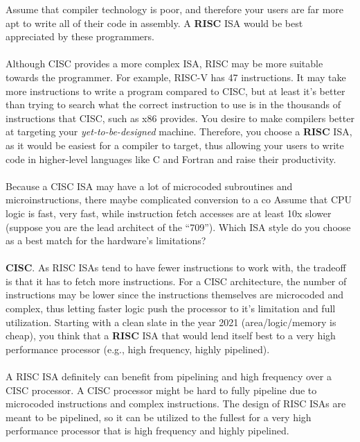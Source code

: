\documentclass[11pt]{article}
\begin{document}
\newpage

\begin{Parts}
	\Part
	Assume that compiler technology is poor, and therefore your users are far more apt to write all of their code in assembly. A \textbf{RISC} ISA would be best appreciated by these programmers. \\ \\
	Although CISC provides a more complex ISA, RISC may be more suitable towards the programmer. For example, RISC-V has 47 instructions. It may take more instructions to write a program compared to CISC, but at least it's better than trying to search what the correct instruction to use is in the thousands of instructions that CISC, such as x86 provides.
	\Part You desire to make compilers better at targeting your \textit{yet-to-be-designed} machine. Therefore, you choose a \textbf{RISC} ISA, as it would be easiest for a compiler to target, thus allowing your users to write code in higher-level languages like C and Fortran and raise their productivity. \\ \\
	Because a CISC ISA may have a lot of microcoded subroutines and microinstructions, there maybe complicated conversion to a co
	\Part Assume that CPU logic is fast, very fast, while instruction fetch accesses are at least 10x slower (suppose you are the lead architect of the “709”). Which ISA style do you choose as a best match for the hardware’s limitations? \\ \\
	\textbf{CISC}. As RISC ISAs tend to have fewer instructions to work with, the tradeoff is that it has to fetch more instructions. For a CISC architecture, the number of instructions may be lower since the instructions themselves are microcoded and complex, thus letting faster logic push the processor to it's limitation and full utilization.
	\Part Starting with a clean slate in the year 2021 (area/logic/memory is cheap), you think that a \textbf{RISC} ISA that would lend itself best to a very high performance processor (e.g., high frequency, highly pipelined). \\ \\
	A RISC ISA definitely can benefit from pipelining and high frequency over a CISC processor. A CISC processor might be hard to fully pipeline due to microcoded instructions and complex instructions. The design of RISC ISAs are meant to be pipelined, so it can be utilized to the fullest for a very high performance processor that is high frequency and highly pipelined.
\end{Parts}
\newpage
\end{document}
